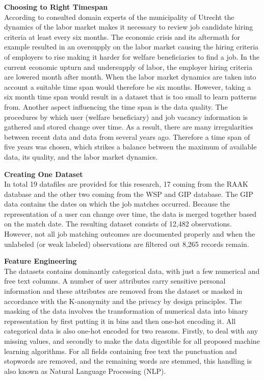 \noindent
\textbf{Choosing to Right Timespan}\\
According to consulted domain experts of the municipality of Utrecht the dynamics of the labor market makes it necessary to review job candidate hiring criteria at least every six months.
The economic crisis and its aftermath for example resulted in an oversupply on the labor market causing the hiring criteria of employers to rise making it harder for welfare beneficiaries to find a job.
In the current economic upturn and undersupply of labor, the employer hiring criteria are lowered month after month. 
When the labor market dynamics are taken into account a suitable time span would therefore be six months.
However, taking a six month time span would result in a dataset that is too small to learn patterns from.
Another aspect influencing the time span is the data quality.
The procedures by which user (welfare beneficiary) and job vacancy information is gathered and stored change over time.
As a result, there are many irregularities between recent data and data from several years ago.
Therefore a time span of five years was chosen, which strikes a balance between the maximum of available data, its quality, and the labor market dynamics.

\noindent
\textbf{Creating One Dataset}\\
In total 19 datafiles are provided for this research, 17 coming from the RAAK database and the other two coming from the WSP and GIP database.
The GIP data contains the dates on which the job matches occurred. 
Because the representation of a user can change over time, the data is merged together based on the match date. 
The resulting dataset consists of 12,482 observations.
However, not all job matching outcomes are documented properly and when the unlabeled (or weak labeled) observations are filtered out 8,265 records remain.

\noindent
\textbf{Feature Engineering}\\
The datasets contains dominantly categorical data, with just a few numerical and free text columns.
A number of user attributes carry sensitive personal information and these attributes are removed from the dataset or masked in accordance with the K-anonymity \cite{sweeney2002k} and the privacy by design \cite{d2015privacy} principles.
The masking of the data involves the transformation of numerical data into binary representation by first putting it in bins and then one-hot encoding it. 
All categorical data is also one-hot encoded for two reasons. 
Firstly, to deal with any missing values, and secondly to make the data digestible for all proposed machine learning algorithms. 
For all fields containing free text the punctuation and stopwords are removed, and the remaining words are stemmed, this handling is also known as Natural Language Processing (NLP).

